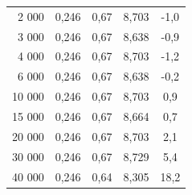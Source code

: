 \documentclass[a4paper, czech]{article}
\begin{document}
\begin{table}[H]
\begin{tabular}{rcccc}
        2 000       & 0,246                                                                       & 0,67                           & 8,703                                                        & -1,0                                                        \\
        3 000       & 0,246                                                                       & 0,67                           & 8,638                                                        & -0,9                                                        \\
        4 000       & 0,246                                                                       & 0,67                           & 8,703                                                        & -1,2                                                        \\
        6 000       & 0,246                                                                       & 0,67                           & 8,638                                                        & -0,2                                                        \\
        10 000      & 0,246                                                                       & 0,67                           & 8,703                                                        & 0,9                                                         \\
        15 000      & 0,246                                                                       & 0,67                           & 8,664                                                        & 0,7                                                         \\
        20 000      & 0,246                                                                       & 0,67                           & 8,703                                                        & 2,1                                                         \\
        30 000      & 0,246                                                                       & 0,67                           & 8,729                                                        & 5,4                                                         \\
        40 000      & 0,246                                                                       & 0,64                           & 8,305                                                        & 18,2                                                        \\

\end{tabular}
\end{table}
\end{document}
